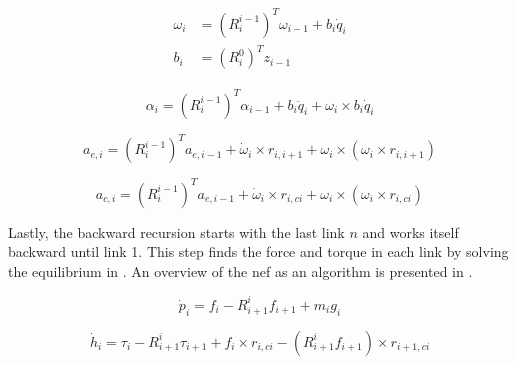 \begin{align}\label{omega}
\begin{split}
\omega_i &= \left ( R^{i-1}_i \right )^T\omega_{i-1} + b_i\dot{q}_i\\
b_i &= \left ( R^0_i \right )^T z_{i-1}
\end{split}
\end{align}

\begin{equation}\label{alpha}
\alpha_i = \left ( R^{i-1}_i \right )^T\alpha_{i-1} + b_i\ddot{q}_i+\omega_i \times b_i\dot{q}_i
\end{equation}

\begin{equation}\label{a_end}
a_{e,i} = \left ( R^{i-1}_i \right )^T a_{e,i-1} + \dot{\omega}_i \times r_{i,i+1}+\omega_i \times \left ( \omega_i \times r_{i,i+1} \right )
\end{equation}

\begin{equation}\label{a_center}
a_{c,i} = \left ( R^{i-1}_i \right )^T a_{e,i-1} + \dot{\omega}_i \times r_{i,ci}+\omega_i \times \left ( \omega_i \times r_{i,ci} \right )
\end{equation}

Lastly, the backward recursion starts with the last link $n$ and works itself backward until link 1. This step finds the force and torque in each link by solving the equilibrium in . An overview of the \gls{nef} as an algorithm is presented in .

\begin{equation}\label{linear_equi}
\dot{p}_i = f_i - R^i_{i+1} f_{i+1} + m_i g_i
\end{equation}

\begin{equation}\label{angular_equi}
\dot{h}_i = \tau_i - R^i_{i+1}\tau_{i+1} + f_i \times r_{i,ci}-\left ( R^i_{i+1}f_{i+1} \right ) \times r_{i+1,ci}
\end{equation}







